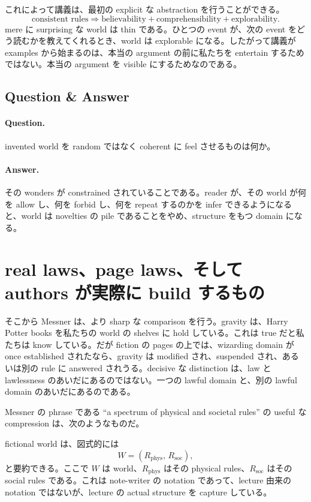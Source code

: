 これによって講義は、最初の explicit な abstraction を行うことができる。
\begin{equation}
\text{consistent rules} \Rightarrow \text{believability} + \text{comprehensibility} + \text{explorability}.
\end{equation}
mere に surprising な world は thin である。ひとつの event が、次の event をどう読むかを教えてくれるとき、world は explorable になる。したがって講義が examples から始まるのは、本当の argument の前に私たちを entertain するためではない。本当の argument を visible にするためなのである。

\subsection{Question \& Answer}

\paragraph{Question.} invented world を random ではなく coherent に feel させるものは何か。

\paragraph{Answer.} その wonders が constrained されていることである。reader が、その world が何を allow し、何を forbid し、何を repeat するのかを infer できるようになると、world は novelties の pile であることをやめ、structure をもつ domain になる。

\section{real laws、page laws、そして authors が実際に build するもの}

そこから Messner は、より sharp な comparison を行う。gravity は、Harry Potter books を私たちの world の shelves に hold している。これは true だと私たちは know している。だが fiction の pages の上では、wizarding domain が once established されたなら、gravity は modified され、suspended され、あるいは別の rule に answered されうる。decisive な distinction は、law と lawlessness のあいだにあるのではない。一つの lawful domain と、別の lawful domain のあいだにあるのである。

Messner の phrase である ``a spectrum of physical and societal rules'' の useful な compression は、次のようなものだ。

\begin{definition}
fictional world は、図式的には
\begin{equation}
W = (R_{\mathrm{phys}},\,R_{\mathrm{soc}}),
\end{equation}
と要約できる。ここで \(W\) は world、\(R_{\mathrm{phys}}\) はその physical rules、\(R_{\mathrm{soc}}\) はその social rules である。これは note-writer の notation であって、lecture 由来の notation ではないが、lecture の actual structure を capture している。
\end{definition}

